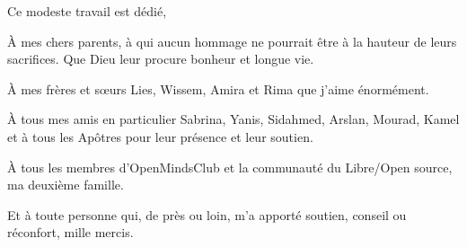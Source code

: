 
Ce modeste travail est dédié,

\setlength{\parindent}{1cm}À mes chers parents, à qui aucun hommage ne pourrait être à la hauteur de leurs sacrifices. Que Dieu leur procure bonheur et longue vie.

À mes frères et sœurs Lies, Wissem, Amira et Rima que j'aime énormément.

À tous mes amis en particulier Sabrina, Yanis, Sidahmed, Arslan, Mourad, Kamel et à tous les Apôtres pour leur présence et leur soutien.

À tous les membres d'OpenMindsClub et la communauté du Libre/Open source, ma deuxième famille. 

Et à toute personne qui, de près ou loin, m'a apporté soutien, conseil ou réconfort, mille mercis.
